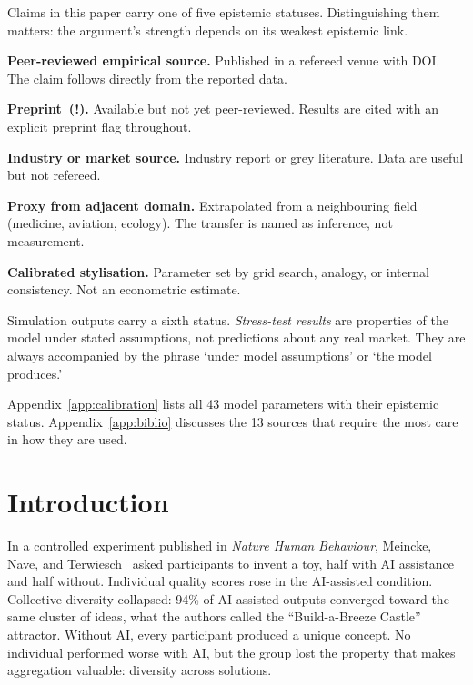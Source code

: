 \documentclass[11pt,a4paper]{article}
\begin{document}
\begin{mdframed}[linewidth=0.8pt,frametitle={How to read this paper}]

Claims in this paper carry one of five epistemic statuses. Distinguishing
them matters: the argument's strength depends on its weakest epistemic link.

\textbf{Peer-reviewed empirical source.} Published in a refereed venue with DOI.
The claim follows directly from the reported data.

\textbf{Preprint~(!).} Available but not yet peer-reviewed. Results are cited
with an explicit preprint flag throughout.

\textbf{Industry or market source.} Industry report or grey literature. Data are
useful but not refereed.

\textbf{Proxy from adjacent domain.} Extrapolated from a neighbouring field
(medicine, aviation, ecology). The transfer is named as inference, not
measurement.

\textbf{Calibrated stylisation.} Parameter set by grid search, analogy, or
internal consistency. Not an econometric estimate.

Simulation outputs carry a sixth status. \textit{Stress-test results} are
properties of the model under stated assumptions, not predictions about any
real market. They are always accompanied by the phrase `under model
assumptions' or `the model produces.'

Appendix~\ref{app:calibration} lists all 43 model parameters with their
epistemic status. Appendix~\ref{app:biblio} discusses the 13 sources that
require the most care in how they are used.
\end{mdframed}

\section{Introduction}\label{sec:intro}

In a controlled experiment published in \textit{Nature Human Behaviour},
Meincke, Nave, and Terwiesch~\cite{meincke_nhb_2025} asked participants to
invent a toy, half with AI assistance and half without. Individual quality
scores rose in the AI-assisted condition. Collective diversity collapsed: 94\%
of AI-assisted outputs converged toward the same cluster of ideas, what the
authors called the ``Build-a-Breeze Castle'' attractor. Without AI, every
participant produced a unique concept. No individual performed worse with AI,
but the group lost the property that makes aggregation valuable: diversity
across solutions.
\end{document}
